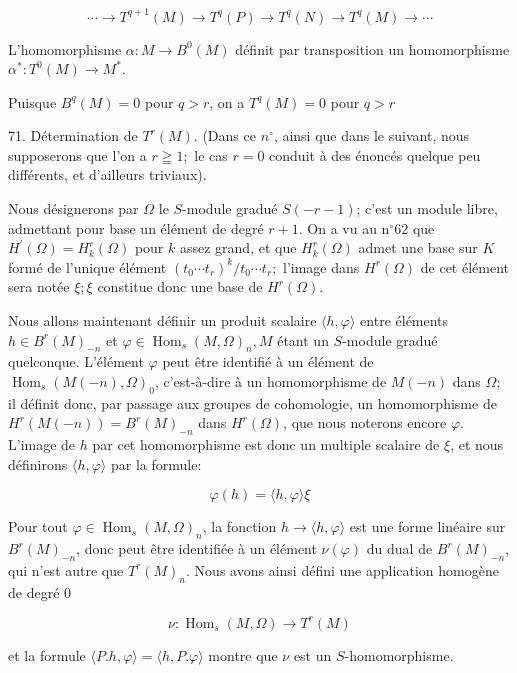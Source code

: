 $$
\cdots \rightarrow T^{q+1}(M) \rightarrow T^{q}(P) \rightarrow T^{q}(N) \rightarrow T^{q}(M) \rightarrow \cdots
$$

L'homomorphisme $\alpha: M \rightarrow B^{0}(M)$ définit par transposition un homomorphisme $\alpha^{*}: T^{0}(M) \rightarrow M^{*}$.

Puisque $B^{q}(M)=0$ pour $q>r$, on a $T^{q}(M)=0$ pour $q>r$

71. Détermination de $T^{r}(M) .$ (Dans ce $n^{\circ}$, ainsi que dans le suivant, nous supposerons que l'on a $r \geqq 1 ;$ le cas $r=0$ conduit à des énoncés quelque peu différents, et d'ailleurs triviaux).

Nous désignerons par $\Omega$ le $S$-module gradué $S(-r-1)$; c'est un module libre, admettant pour base un élément de degré $r+1$. On a vu au $\mathrm{n}^{\circ} 62$ que $H^{\prime}(\Omega)=H_{k}^{r}(\Omega)$ pour $k$ assez grand, et que $H_{k}^{r}(\Omega)$ admet une base sur $K$ formé de l'unique élément $\left(t_{0} \cdots t_{r}\right)^{k} / t_{0} \cdots t_{r} ;$ l'image dans $H^{r}(\Omega)$ de cet élément sera notée $\xi ; \xi$ constitue donc une base de $H^{r}(\Omega)$.

Nous allons maintenant définir un produit scalaire $\langle h, \varphi\rangle$ entre éléments $h \in B^{r}(M)_{-n}$ et $\varphi \in \operatorname{Hom}_{s}(M, \Omega)_{n}, M$ étant un $S$-module gradué quelconque. L'élément $\varphi$ peut être identifié à un élément de $\operatorname{Hom}_{s}(M(-n), \Omega)_{0}$, c'est-à-dire à un homomorphisme de $M(-n)$ dans $\Omega$; il définit donc, par passage aux groupes de cohomologie, un homomorphisme de $H^{r}(M(-n))=B^{r}(M)_{-n}$ dans $H^{r}(\Omega)$, que nous noterons encore $\varphi$. L'image de $h$ par cet homomorphisme est donc un multiple scalaire de $\xi$, et nous définirons $\langle h, \varphi\rangle$ par la formule:

$$
\varphi(h)=\langle h, \varphi\rangle \xi
$$

Pour tout $\varphi \in \operatorname{Hom}_{s}(M, \Omega)_{n}$, la fonction $h \rightarrow\langle h, \varphi\rangle$ est une forme linéaire sur $B^{r}(M)_{-n}$, donc peut être identifiée à un élément $\nu(\varphi)$ du dual de $B^{r}(M)_{-n}$, qui n'est autre que $T^{r}(M)_{n} .$ Nous avons ainsi défini une application homogène de degré 0

$$
\nu: \operatorname{Hom}_{s}(M, \Omega) \rightarrow T^{r}(M)
$$

et la formule $\langle P . h, \varphi\rangle=\langle h, P . \varphi\rangle$ montre que $\nu$ est un $S$-homomorphisme.

